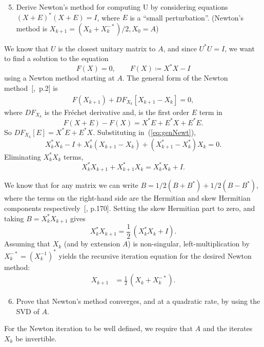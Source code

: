 \documentclass[10pt, A4paper]{article}
\begin{document}
\vspace{0.2cm}
\begin{enumerate}
	\setcounter{enumi}{4}
	\item Derive Newton's method for computing U by considering
	equations $(X+E)^*(X+E) = I$, where $E$ is a ``small perturbation''.
	(Newton's method is $X_{k+1} = (X_k + X_k^{-*})/2, X_0 = A$)
\end{enumerate}

We know that $U$ is the closest unitary matrix to $A$, and since 
$U^*U=I$, we want to find a solution to the equation
$$
	F(X) = 0,\qquad F(X)\coloneqq X^*X - I
$$
using a Newton method starting at $A$.
The general form of the Newton method~{[\citealp{Kell2003},~p.2]} is
\begin{align}
	F(X_{k+1}) + DF_{X_k} \left[X_{k+1} - X_k\right] = 0,
	\label{eq:genNewt}
\end{align}
where $DF_{X_k}$ is the Fréchet derivative and, is the first order $E$ 
term in
$$
	F(X+E) - F(X) = X^*E + E^*X + E^*E.
$$
So $DF_{X_k}[E] = X^*E + E^*X$.
Substituting in~(\ref{eq:genNewt}),
$$
	X_k^*X_k - I + X_k^* \left( X_{k+1} - X_k \right) + 
		\left( X_{k+1}^* - X_k^* \right)X_k = 0.
$$
Eliminating $X_k^*X_k$ terms,
$$
	X_k^* X_{k+1} + X_{k+1}^*X_k = X_k^* X_k + I.
$$

We know that for any matrix we can write $B = 1/2(B + B^*) + 
1/2(B-B^*)$, where the terms on the right-hand side are the Hermitian 
and skew Hermitian components respectively~[\citealp{hojo1985}, p.170].
Setting the skew Hermitian part to zero, and taking $B = X_k^*X_{k+1}$ 
gives
$$ X_k^*X_{k+1} = \frac{1}{2} \, (X_k^*X_k + I).$$
Assuming that $X_k$ (and by extension $A$) is non-singular, 
left-multiplication by $X_k^{-*} = (X_k^{-1})^*$ yields the recursive 
iteration equation for the desired Newton method:
\begin{align}
	X_{k+1} &= \frac{1}{2} \, (X_k + X_k^{-*}).
	\label{eq:newton}
\end{align}





\vspace{0.2cm}
\begin{enumerate}
	\setcounter{enumi}{5}
	\item Prove that Newton's method converges, and at a quadratic
	rate, by using the SVD of $A$.
\end{enumerate}

For the Newton iteration to be well defined, we require that $A$ and 
the iterates $X_k$ be invertible.
\end{document}
